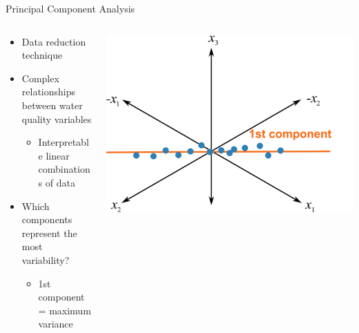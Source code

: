 \documentclass{beamer}
\providecommand{\tightlist}{%
  \setlength{\itemsep}{0pt}\setlength{\parskip}{0pt}}
\begin{document}
\begin{frame}{Principal Component Analysis}
\protect\hypertarget{principal-component-analysis}{}

\begin{columns}[T]
\begin{column}{0.48\textwidth}
\begin{itemize}
\tightlist
\item
  Data reduction technique
\item
  Complex relationships between water quality variables

  \begin{itemize}
  \tightlist
  \item
    Interpretable linear combinations of data
  \end{itemize}
\item
  Which components represent the most variability?

  \begin{itemize}
  \tightlist
  \item
    1st component = maximum variance
  \end{itemize}
\end{itemize}
\end{column}

\begin{column}{0.48\textwidth}
\includegraphics{images/pca.png}
\end{column}
\end{columns}

\end{frame}
\end{document}
